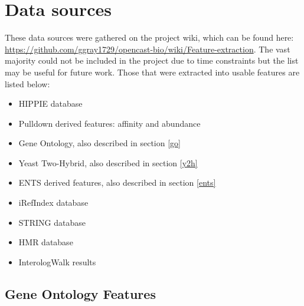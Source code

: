 \chapter{Data sources}
\label{datasources}

These data sources were gathered on the project wiki, which can be found here: \url{https://github.com/ggray1729/opencast-bio/wiki/Feature-extraction}.
The vast majority could not be included in the project due to time constraints but the list may be useful for future work.
Those that were extracted into usable features are listed below:

\begin{itemize}
    \item HIPPIE database\autocite{schaefer_hippie:_2012}
    \item Pulldown derived features: affinity and abundance
    \item Gene Ontology\autocite{ashburner_gene_2000}, also described in section \ref{go}
    \item Yeast Two-Hybrid, also described in section \ref{y2h}
    \item ENTS derived features\autocite{rodgers-melnick_predicting_2013}, also described in section \ref{ents}
    \item iRefIndex database\autocite{razick_irefindex:_2008}
    \item STRING database\autocite{von_mering_string_2005}
    \item HMR database
    \item InterologWalk results\autocite{gallone_bio::homology::interologwalk_2011}
\end{itemize}


\section{Gene Ontology Features}
\label{app:go}

